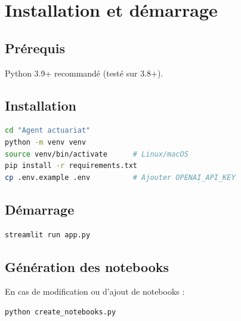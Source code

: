 \documentclass[11pt,a4paper]{article}
\begin{document}
\section{Installation et démarrage}

\subsection{Prérequis}
Python 3.9+ recommandé (testé sur 3.8+).

\subsection{Installation}
\begin{lstlisting}[language=bash]
cd "Agent actuariat"
python -m venv venv
source venv/bin/activate      # Linux/macOS
pip install -r requirements.txt
cp .env.example .env          # Ajouter OPENAI_API_KEY
\end{lstlisting}

\subsection{Démarrage}
\begin{lstlisting}[language=bash]
streamlit run app.py
\end{lstlisting}

\subsection{Génération des notebooks}
En cas de modification ou d'ajout de notebooks :
\begin{lstlisting}[language=bash]
python create_notebooks.py
\end{lstlisting}
\end{document}
